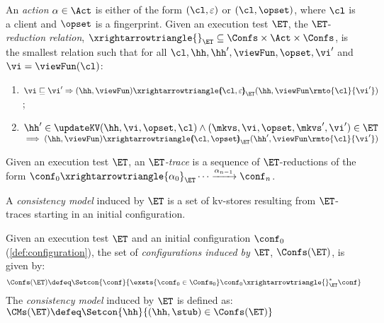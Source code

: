 \begin{definition}[$\ET$-trace]
\label{def:reduction}
An \emph{action} $\alpha \in \Act$ is either of the form $(\cl, \varepsilon)$ or $(\cl, \opset)$, 
where $\cl$ is a client and $\opset$ is a fingerprint. 
Given an execution test $\ET$, the $\ET$-\emph{reduction relation},
$\xrightarrowtriangle{}_{\ET} \subseteq \Confs \times \Act \times \Confs$, 
is the smallest relation such that for all $\cl, \hh, \hh', \viewFun, \opset, \vi'$ and $\vi = \viewFun(\cl)$:
\begin{enumerate}
	\item
    $\vi \sqsubseteq \vi'
    \Rightarrow
    (\hh, \viewFun) \xrightarrowtriangle{\hspace{-5pt}(\cl, \varepsilon)\hspace{-5pt}}_{\ET} 
    (\hh, \viewFun\rmto{\cl}{\vi'})$; 
	\item 
    $\hh' \in \updateKV(\hh, \vi , \opset, \cl)
     \wedge (\mkvs, \vi, \opset, \mkvs', \vi') \in \ET
	$  \\
	\phantom{a} \hfill $\implies (\hh, \viewFun) \xrightarrowtriangle{\hspace{-5pt}(\cl, \opset)\hspace{-5pt}}_{\ET} (\hh', \viewFun\rmto{\cl}{\vi'})$
\end{enumerate}
Given an execution test $\ET$, an \emph{$\ET$-trace} is a sequence of $\ET$-reductions of the form $\conf_{0} \xrightarrowtriangle{\alpha_{0}}_{\ET} \cdots 
\xrightarrow{\alpha_{n-1}} \conf_{n}$.
\end{definition}




A \emph{consistency model} induced by $\ET$ is a set of kv-stores
resulting from $\ET$-traces starting in an 
initial configuration. 

\begin{definition}
\label{def:cm}
Given an execution test $\ET$ and an initial configuration $\conf_0$ (\cref{def:configuration}),
the set of \emph{configurations induced by $\ET$},  $\Confs(\ET)$, is   given by: 
\[
\Confs(\ET)\defeq 
\Setcon{ \conf}{ 
	\exsts{\conf_0 \in \Confs_0}
	\conf_0 \xrightarrowtriangle{}_{\ET}^{*} \conf
}
\]
The \emph{consistency model} induced by $\ET$ is defined as:
\( 
\CMs(\ET) \defeq \Setcon{ \hh }{ (\hh, \stub) \in \Confs(\ET) }
\)
\end{definition}


